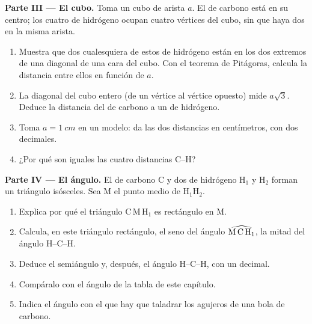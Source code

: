 \begin{problem}
\medskip
\noindent\textbf{Parte III --- El cubo.}
Toma un cubo de arista $a$. El  de carbono está en su centro; los
cuatro  de hidrógeno ocupan cuatro vértices del cubo, sin que haya
dos en la misma arista.
\begin{enumerate}[resume]
  \item Muestra que dos cualesquiera de estos  de hidrógeno están
        en los dos extremos de una diagonal de una cara del cubo. Con el
        teorema de Pitágoras, calcula la distancia entre ellos en función
        de $a$.
  \item La diagonal del cubo entero (de un vértice al vértice opuesto)
        mide $a\sqrt{3}$. Deduce la distancia del  de carbono a un
         de hidrógeno.
  \item Toma $a = \qty{1}{cm}$ en un modelo: da las dos distancias en
        centímetros, con dos decimales.
  \item ¿Por qué son iguales las cuatro distancias C--H?
\end{enumerate}

\medskip
\noindent\textbf{Parte IV --- El ángulo.}
El  de carbono C y dos  de hidrógeno H$_1$ y H$_2$ forman un
triángulo isósceles. Sea M el punto medio de H$_1$H$_2$.
\begin{enumerate}[resume]
  \item Explica por qué el triángulo C\,M\,H$_1$ es rectángulo en M.
  \item Calcula, en este triángulo rectángulo, el seno del ángulo
        $\widehat{\text{M\,C\,H}_1}$, la mitad del ángulo H--C--H.
  \item Deduce el semiángulo y, después, el ángulo H--C--H, con un
        decimal.
  \item Compáralo con el ángulo de la tabla de este capítulo.
  \item Indica el ángulo con el que hay que taladrar los agujeros de una
        bola de carbono.
\end{enumerate}
\end{problem}
